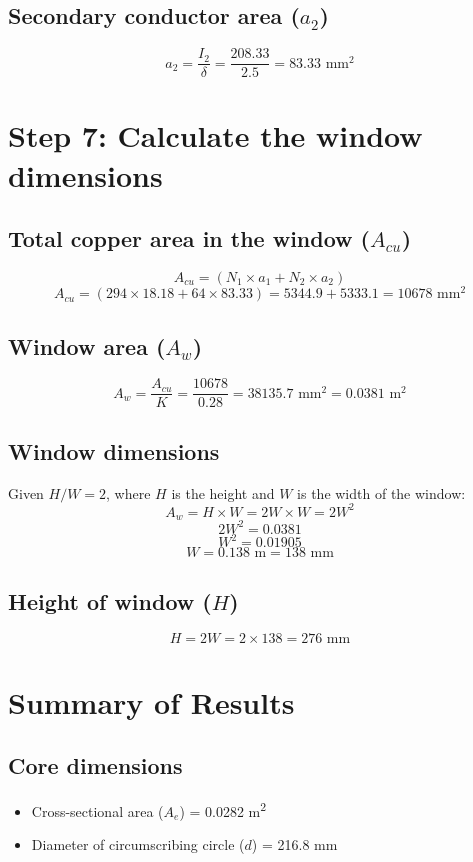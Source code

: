 \documentclass[12pt]{article}
\begin{document}
\subsection*{Secondary conductor area ($a_2$)}
\[
a_2 = \frac{I_2}{\delta} = \frac{208.33}{2.5} = 83.33 \text{ mm}^2
\]

\section*{Step 7: Calculate the window dimensions}
\subsection*{Total copper area in the window ($A_{cu}$)}
\[
A_{cu} = (N_1 \times a_1 + N_2 \times a_2)
\]
\[
A_{cu} = (294 \times 18.18 + 64 \times 83.33) = 5344.9 + 5333.1 = 10678 \text{ mm}^2
\]

\subsection*{Window area ($A_w$)}
\[
A_w = \frac{A_{cu}}{K} = \frac{10678}{0.28} = 38135.7 \text{ mm}^2 = 0.0381 \text{ m}^2
\]

\subsection*{Window dimensions}
Given $H/W = 2$, where $H$ is the height and $W$ is the width of the window:
\[
A_w = H \times W = 2W \times W = 2W^2
\]
\[
2W^2 = 0.0381
\]
\[
W^2 = 0.01905
\]
\[
W = 0.138 \text{ m} = 138 \text{ mm}
\]

\subsection*{Height of window ($H$)}
\[
H = 2W = 2 \times 138 = 276 \text{ mm}
\]

\section*{Summary of Results}

\subsection*{Core dimensions}
\begin{itemize}
	\item Cross-sectional area ($A_e$) = 0.0282 m\textsuperscript{2}
	\item Diameter of circumscribing circle ($d$) = 216.8 mm
\end{itemize}
\end{document}
